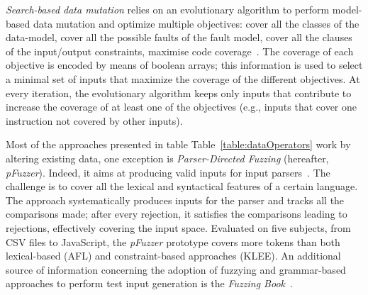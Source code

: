 \emph{Search-based data mutation} relies on an evolutionary algorithm to perform model-based data mutation and optimize multiple objectives:  
cover all the classes of the data-model, cover all the possible faults of the fault model, cover all the clauses of the input/output constraints,
maximise code coverage~\cite{di2015evolutionary}.
The coverage of each objective is encoded by means of boolean arrays; this information is used to select a minimal set of inputs that maximize the coverage of the different objectives.
At every iteration, the evolutionary algorithm keeps only inputs that contribute to increase the coverage of at least one of the objectives (e.g., inputs that cover one instruction not covered by other inputs).


Most of the approaches presented in table Table~\ref{table:dataOperators} work by altering existing data, one exception is
\emph{Parser-Directed Fuzzing} (hereafter, \emph{pFuzzer}). Indeed, it aims at producing valid inputs for input parsers~\cite{mathis2019parser}. The challenge is to cover all the lexical and syntactical features of a certain language. The approach systematically produces inputs for the parser and tracks all the comparisons made; after every rejection, it satisfies the comparisons leading to rejections, effectively covering the input space. 
Evaluated on five subjects, from CSV files to JavaScript, the \emph{pFuzzer} prototype covers more tokens than both lexical-based (AFL) and constraint-based approaches (KLEE).
An additional source of information concerning the adoption of fuzzying and grammar-based approaches to perform test input generation is the \emph{Fuzzing Book}~\cite{fuzzingbook2019:GrammarFuzzer}.

\clearpage
